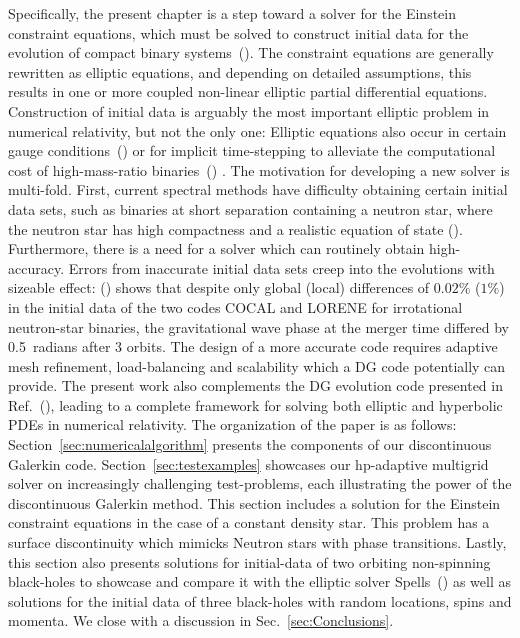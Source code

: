 Specifically, the present chapter is a step
toward a solver for the Einstein constraint
equations, which must be solved to
construct initial data for the evolution of compact binary
systems~(\citet*{pfeiffer:2005,cook2000,baumgarte2010numerical}).  The
constraint equations are generally rewritten as elliptic equations,
and depending on detailed assumptions, this results in one or more
coupled non-linear elliptic partial differential equations.
Construction of initial data is arguably the most important
elliptic problem in numerical relativity, but not the only one:
Elliptic equations also occur in certain gauge
conditions~(\citet*{baumgarte2010numerical}) or for implicit
time-stepping to alleviate the computational cost of high-mass-ratio
binaries~(\citet*{laupfeiffer2008,lau:2011we})
.
%
%
The motivation for developing
a new solver is multi-fold. First, current spectral methods have
difficulty obtaining certain initial data sets, such as binaries at
short separation containing a neutron star, where the neutron star has
high compactness and a realistic equation of state
(\citet*{henriksson:2014tba}).  Furthermore, there is a need for a
solver which can routinely obtain high-accuracy. Errors from
inaccurate initial data sets creep into the evolutions with sizeable
effect: (\citet*{tsokaros2016initialfixed}) shows that despite only
global (local) differences of $0.02\%$ ($1\%$) in the initial data of
the two codes COCAL and LORENE for irrotational neutron-star binaries,
the gravitational wave phase at the merger time differed by 0.5~radians after 3 orbits. The design of a more accurate code requires adaptive mesh refinement, load-balancing and
scalability which a DG code potentially can
provide. The present work also complements the DG evolution code presented in Ref.~(\citet*{kidder:16}),
leading to a complete framework for solving both
elliptic and hyperbolic PDEs in numerical relativity.
%
%
The organization of the paper is as follows: 
Section~\ref{sec:numericalalgorithm} presents the components of our
  discontinuous Galerkin code. Section~\ref{sec:testexamples} 
  showcases our hp-adaptive multigrid solver on  increasingly challenging test-problems, each
  illustrating the power of the discontinuous Galerkin method. This section includes a solution for the Einstein constraint equations in the case of a constant density star. This problem has a surface discontinuity which mimicks Neutron stars with phase transitions. Lastly, this section also presents solutions for
  initial-data of two orbiting non-spinning black-holes to
  showcase and compare it with the elliptic solver Spells~(\citet*{pfeiffer2003})
 as well as solutions for the initial data
  of three black-holes with random locations, spins and momenta.  We
  close with a discussion in Sec.~\ref{sec:Conclusions}.
%

